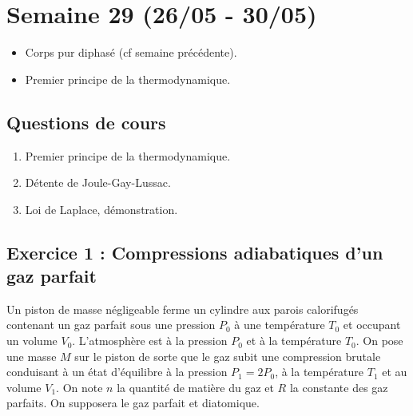 \section{Semaine 29 (26/05 - 30/05) }


\begin{itemize}
	\item Corps pur diphasé (cf semaine précédente).
	\item Premier principe de la thermodynamique.
\end{itemize}

\subsection{Questions de cours}

\begin{enumerate}
	\item Premier principe de la thermodynamique.
	\item Détente de Joule-Gay-Lussac.
	\item Loi de Laplace, démonstration.
\end{enumerate}

\subsection{Exercice 1 : Compressions adiabatiques d'un gaz parfait}

Un piston de masse négligeable ferme un cylindre aux parois calorifugés contenant un gaz parfait sous une pression $P_0$ à une température $T_0$ et occupant un volume $V_0$. L'atmosphère est à la pression $P_0$ et à la température $T_0$. On pose une masse $M$ sur le piston de sorte que le gaz subit une compression brutale conduisant à un état d'équilibre à la pression $P_1 = 2P_0$, à la température $T_1$ et au volume $V_1$. On note $n$ la quantité de matière du gaz et $R$ la constante des gaz parfaits. On supposera le gaz parfait et diatomique.

